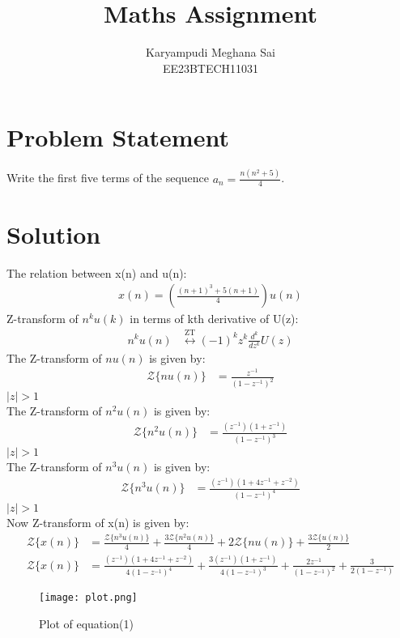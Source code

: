 \documentclass{article}
\begin{document}
\title{Maths Assignment}
\author{Karyampudi Meghana Sai\\ EE23BTECH11031}
\maketitle

\section*{Problem Statement}
Write the first five terms of the sequence \(a_n = \frac{n(n^2+5)}{4}\).

\section*{Solution}


The relation between x(n) and u(n):
\begin{align}
 x(n) = \left(\frac{(n+1)^3+5(n+1)}{4}\right) u(n)
 \end{align}
Z-transform of $n^ku(k)$ in terms of kth derivative of U(z):
\begin{align}
n^k u(n) &\overset{\text{ZT}}{\longleftrightarrow} (-1)^k z^k \frac{d^k}{dz^k}U(z)
\end{align}
The Z-transform of $nu(n)$ is given by:
\begin{align}
\mathcal{Z}\{nu(n)\} &= \frac{z^{-1}}{(1 - z^{-1})^2}
\end{align}
 $\lvert z \rvert > 1$\\
The Z-transform of $n^2u(n)$ is given by:
\begin{align}
\mathcal{Z}\{n^2u(n)\} &= \frac{(z^{-1})(1+z^{-1})}{(1-z^{-1})^3}
\end{align}
 $\lvert z \rvert > 1$\\
The Z-transform of $n^3u(n)$ is given by:
\begin{align}
\mathcal{Z}\{n^3u(n)\} &= \frac{(z^{-1})(1+4z^{-1}+z^{-2})}{(1-z^{-1})^4}
\end{align}
 $\lvert z \rvert > 1$\\
Now Z-transform of x(n) is given by:
\begin{align}
\mathcal{Z}\{x(n)\} &=\frac{\mathcal{Z}\{n^3u(n)\}}{4} +\frac{3\mathcal{Z}\{n^2u(n)\}}{4} +2\mathcal{Z}\{nu(n)\} +\frac{3\mathcal{Z}\{u(n)\}}{2}\\
\mathcal{Z}\{x(n)\} &=\frac{(z^{-1})(1+4z^{-1}+z^{-2})}{4(1-z^{-1})^4} +\frac{3(z^{-1})(1+z^{-1})}{4(1-z^{-1})^3} +\frac{2z^{-1}}{(1 - z^{-1})^2} +\frac{3}{2(1- z^{-1})}
\end{align}
\newpage
\begin{figure}
    \centering
    \texttt{[image: plot.png]}
    \caption{Plot of equation(1)}
    \label{fig:plot}
\end{figure}
\end{document}
